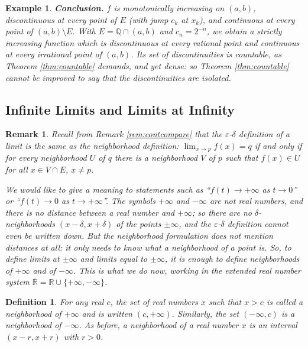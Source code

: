 \documentclass{article}
\theoremstyle{mythm}
\newtheorem{definition}[theorem]{Definition}
\newtheorem{remark}[theorem]{Remark}
\newtheorem{example}[theorem]{Example}
\begin{document}
\begin{example}
\textbf{Conclusion.} $f$ is monotonically increasing on $(a,b)$, discontinuous at every point of $E$ (with jump $c_k$ at $x_k$), and continuous at every point of $(a,b) \setminus E$. With $E = \mathbb{Q} \cap (a,b)$ and $c_n = 2^{-n}$, we obtain a strictly increasing function which is discontinuous at every rational point and continuous at every irrational point of $(a,b)$. Its set of discontinuities is countable, as Theorem \ref{thm:countable} demands, and yet dense: so Theorem \ref{thm:countable} cannot be improved to say that the discontinuities are isolated.
\end{example}

\subsection{Infinite Limits and Limits at Infinity}\label{sec:infinite}

\begin{remark}\label{rem:whynbhd}
Recall from Remark \ref{rem:contcompare} that the $\varepsilon$-$\delta$ definition of a limit is the same as the neighborhood definition: $\lim_{x\to p} f(x) = q$ if and only if for every neighborhood $U$ of $q$ there is a neighborhood $V$ of $p$ such that $f(x) \in U$ for all $x \in V \cap E$, $x \neq p$.

We would like to give a meaning to statements such as ``$f(t) \to +\infty$ as $t \to 0$'' or ``$f(t) \to 0$ as $t \to +\infty$''. The symbols $+\infty$ and $-\infty$ are not real numbers, and there is no distance between a real number and $+\infty$; so there are no $\delta$-neighborhoods $(x - \delta, x+\delta)$ of the points $\pm\infty$, and the $\varepsilon$-$\delta$ definition cannot even be written down. But the neighborhood formulation does not mention distances at all: it only needs to know what a \textit{neighborhood} of a point is. So, to define limits at $\pm\infty$ and limits equal to $\pm\infty$, it is enough to define neighborhoods of $+\infty$ and of $-\infty$. This is what we do now, working in the extended real number system $\overline{\mathbb{R}} = \mathbb{R} \cup \{+\infty, -\infty\}$.
\end{remark}

\begin{definition}\label{def:nbhdinfty}
For any real $c$, the set of real numbers $x$ such that $x > c$ is called a \textit{neighborhood of $+\infty$} and is written $(c, +\infty)$. Similarly, the set $(-\infty, c)$ is a \textit{neighborhood of $-\infty$}. As before, a neighborhood of a real number $x$ is an interval $(x - r, x + r)$ with $r > 0$.
\end{definition}
\end{document}
